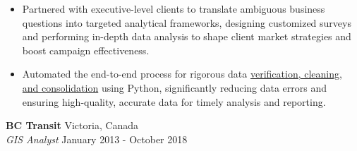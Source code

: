 \documentclass[letterpaper]{article}
\newcommand{\employer}[4]{
        \vspace{3pt}
        \textbf{#1}  %
        \hfill #2\\  %
        \textit{#3}  %
        \hfill #4\\  %
        \vspace{3mm}
    }
\newenvironment{jobtasklist}
        {
            \vspace{-12pt}
            \begin{itemize} \itemsep 0pt
        }{
            \end{itemize}
            \vspace{-3pt}
        }
\newcommand{\impt}[1]{\uline{#1}}
\begin{document}
\begin{jobtasklist}
        \item Partnered with executive-level clients to translate ambiguous business questions
                into targeted analytical frameworks, designing customized surveys and
                performing in-depth data analysis to shape client market strategies 
                and boost campaign effectiveness.
        \item Automated the end-to-end process for rigorous data
                \impt{verification, cleaning, and consolidation} using Python,
                significantly reducing data errors and ensuring high-quality, 
                accurate data for timely analysis and reporting.
\end{jobtasklist}


\employer
    {BC Transit}
    {Victoria, Canada}
    {GIS Analyst}
    {January 2013 - October 2018}
\end{document}
